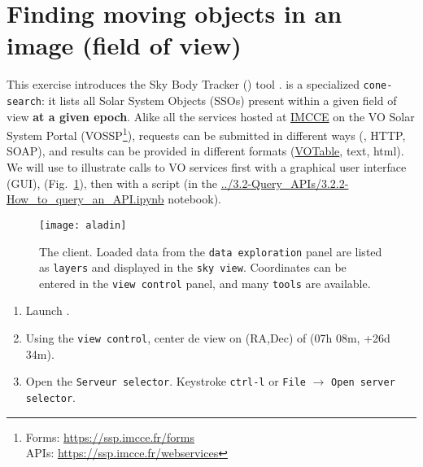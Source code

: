 \section{Finding moving objects in an image (field of view)}
\setcounter{questions}{1}


  This exercise introduces the Sky Body Tracker (\skybot) tool
  \citep{2006-ASPC-351-Berthier}.
  \skybot is a specialized \texttt{cone-search}: it lists
  all Solar System Objects (SSOs) present within
  a given field of view \textbf{at a given epoch}.
  Alike all the services hosted at
  \href{https://www.imcce.fr}{IMCCE}
  on the VO Solar System Portal
  (VOSSP\footnote{Forms: \href{https://ssp.imcce.fr/forms}{https://ssp.imcce.fr/forms}\\
  \hspace*{1.8em}APIs: \href{https://ssp.imcce.fr/webservices}{https://ssp.imcce.fr/webservices}}),
  \skybot requests
  can be submitted in different ways
  (\aladin, HTTP, SOAP), and results can be provided in different 
  formats (\href{https://www.ivoa.net/documents/VOTable/}{VOTable}, text, html).\\

  We will use \skybot to illustrate calls to VO services first with
  a graphical user interface (GUI), \aladin (Fig.~\ref{fig:aladin}), then 
  with a \python script (in the \url{../3.2-Query_APIs/3.2.2-How_to_query_an_API.ipynb} notebook).


\begin{figure}[ht]
  \centering
  \texttt{[image: aladin]}
  \caption{The \aladin client. Loaded data from the
  \texttt{data exploration} panel are listed as
  \texttt{layers} and displayed in the  
  \texttt{sky view}. Coordinates can be entered in the
  \texttt{view control} panel, and many
  \texttt{tools} are available.
  }
  \label{fig:aladin}
\end{figure}

\newpage
  \begin{enumerate}
    \setlength\itemsep{0em}
    \item Launch \aladin.

    \item Using the \texttt{view control}, center de view on (RA,Dec) of (07h 08m, +26d 34m).

    \item Open the \texttt{Serveur selector}. Keystroke \texttt{ctrl-l} or \texttt{File} 
      $\rightarrow$ \texttt{Open server selector}.
  \end{enumerate}
  \setcounter{saveitem}{\value{enumi}}  

